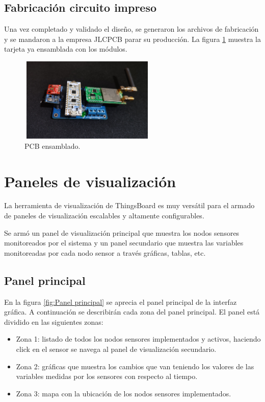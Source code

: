 \subsection{Fabricación circuito impreso} 
Una vez completado y validado el diseño, se generaron los archivos de fabricación y se mandaron a la empresa JLCPCB parar su producción. La figura \ref{fig:PCB ensamblado} muestra la tarjeta ya ensamblada con los módulos. 
\begin{figure}[h!]
  \centering
	\includegraphics[width=6.5cm, height=4cm]{./Figures/hardware_vistalateral.jpg}
  \caption{PCB ensamblado.}
	\label{fig:PCB ensamblado}
\end{figure}

\section{Paneles de visualización}
La herramienta de visualización de ThingsBoard es muy versátil para el armado de paneles de visualización escalables y altamente configurables.

Se armó un panel de visualización principal que muestra los nodos sensores monitoreados por el sistema y un panel secundario que muestra las variables monitoreadas por cada nodo sensor a través gráficas, tablas, etc.

\subsection{Panel principal} 

En la figura \ref{fig:Panel principal} se aprecia el panel principal de la interfaz gráfica. A continuación se describirán cada zona del panel principal.
El panel está dividido en las siguientes zonas:
\begin{itemize}
  \item Zona 1: listado de todos los nodos sensores implementados y activos, haciendo click en el sensor se navega al panel de visualización secundario.
  \item Zona 2: gráficas que muestra los cambios que van teniendo los valores de las variables medidas por los sensores con respecto al tiempo.
  \item Zona 3: mapa con la ubicación de los nodos sensores implementados.
\end{itemize}

